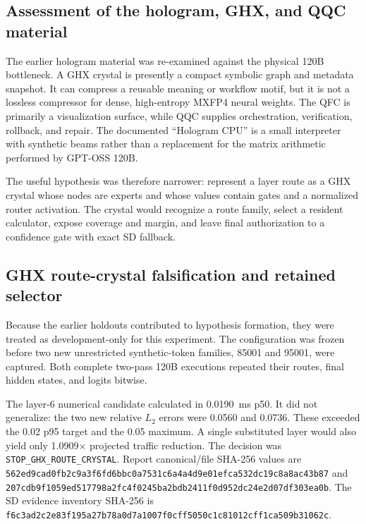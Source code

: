 \subsection{Assessment of the hologram, GHX, and QQC material}

The earlier hologram material was re-examined against the physical 120B
bottleneck.  A GHX crystal is presently a compact symbolic graph and metadata
snapshot.  It can compress a reusable meaning or workflow motif, but it is not
a lossless compressor for dense, high-entropy MXFP4 neural weights.  The QFC is
primarily a visualization surface, while QQC supplies orchestration,
verification, rollback, and repair.  The documented ``Hologram CPU'' is a small
interpreter with synthetic beams rather than a replacement for the matrix
arithmetic performed by GPT-OSS 120B.

The useful hypothesis was therefore narrower: represent a layer route as a GHX
crystal whose nodes are experts and whose values contain gates and a normalized
router activation.  The crystal would recognize a route family, select a
resident calculator, expose coverage and margin, and leave final authorization
to a confidence gate with exact SD fallback.

\subsection{GHX route-crystal falsification and retained selector}

Because the earlier holdouts contributed to hypothesis formation, they were
treated as development-only for this experiment.  The configuration was frozen
before two new unrestricted synthetic-token families, 85001 and 95001, were
captured.  Both complete two-pass 120B executions repeated their routes, final
hidden states, and logits bitwise.

The layer-6 numerical candidate calculated in 0.0190~ms p50.  It did not
generalize: the two new relative $L_2$ errors were 0.0560 and 0.0736.  These
exceeded the 0.02 p95 target and the 0.05 maximum.  A single substituted layer
would also yield only 1.0909$\times$ projected traffic reduction.  The decision
was \texttt{STOP\_GHX\_ROUTE\_CRYSTAL}.  Report canonical/file SHA-256 values
are
\texttt{562ed9cad0fb2c9a3f6fd6bbc0a7531c6a4a4d9e01efca532dc19c8a8ac43b87}
and
\texttt{207cdb9f1059ed517798a2fc4f0245ba2bdb2411f0d952dc24e2d07df303ea0b}.
The SD evidence inventory SHA-256 is
\texttt{f6c3ad2c2e83f195a27b78a0d7a1007f0cff5050c1c81012cff1ca509b31062c}.

